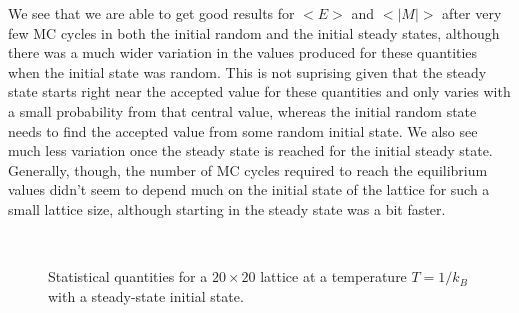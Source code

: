 \documentclass[12pt]{article}
\numberwithin{equation}{section}
\begin{document}
\par We see that we are able to get good results for $<E>$ and $<|M|>$ after very few MC cycles in both the initial random and the initial steady states, although there was a much wider variation in the values produced for these quantities when the initial state was random.  This is not suprising given that the steady state starts right near the accepted value for these quantities and only varies with a small probability from that central value, whereas the initial random state needs to find the accepted value from some random initial state.  We also see much less variation once the steady state is reached for the initial steady state.  Generally, though, the number of MC cycles required to reach the equilibrium values didn't seem to depend much on the initial state of the lattice for such a small lattice size, although starting in the steady state was a bit faster.  

\begin{figure}[h]
\begin{center}
 \\
\caption{Statistical quantities for a $20\times20$ lattice at a temperature $T=1/k_{B}$ with a steady-state initial state.}
\label{fig:size20temp1steady}
\end{center}
\end{figure}
\end{document}
